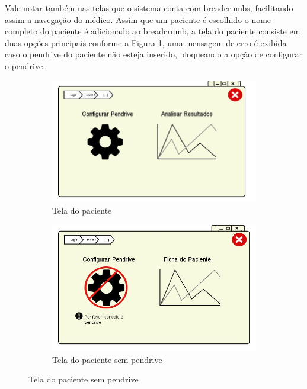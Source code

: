 \documentclass[12pt]{article}
\begin{document}
Vale notar também nas telas que o sistema conta com breadcrumbs, facilitando assim a navegação do médico. Assim que um paciente é escolhido o nome completo do paciente é adicionado ao breadcrumb, a tela do paciente consiste em duas opções principais conforme a Figura \ref{2Tela_Usuario}, uma mensagem de erro é exibida caso o pendrive do paciente não esteja inserido, bloqueando a opção de configurar o pendrive.
\newpage
\begin{figure}[h]
\begin{subfigure}{0.5\textwidth}
\centering
\includegraphics[scale=0.3]{imagens/2Tela_Usuario.jpg}
\caption{Tela do paciente}
\label{2Tela_Usuario}
\end{subfigure}
\begin{subfigure}{0.5\textwidth}
\includegraphics[scale=0.3]{imagens/2-1Tela_Usuario_Sem_Pednrive.jpg} 
\caption{Tela do paciente sem pendrive}
\label{2Tela_Usuario1}
\end{subfigure}
\end{figure}
\end{document}
